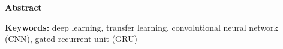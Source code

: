 \thispagestyle{plain}
\begin{center}
    \LARGE{\textbf{Abstract}}
\end{center}
\lipsum[1]     

\textbf{Keywords:} deep learning, transfer learning, convolutional neural network (CNN), gated recurrent unit (GRU)    